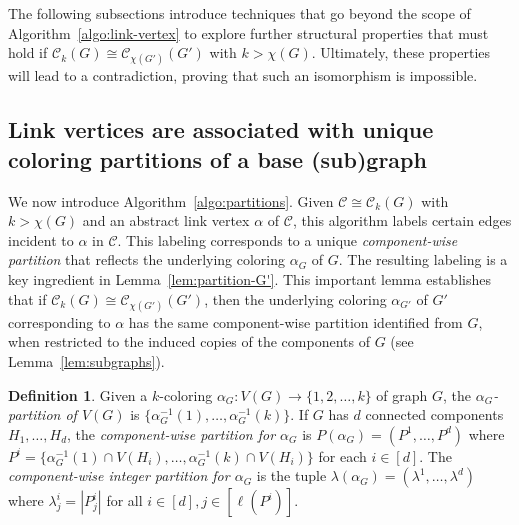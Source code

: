 \documentclass{amsart}
\theoremstyle{hypothesisstyle}
\newcommand{\set}[1]{\{#1\}}
\theoremstyle{definition}
\newtheorem{definition}[theorem]{Definition}
\theoremstyle{remark}
\numberwithin{equation}{section}
\newcommand{\C}{\mathcal C}
\begin{document}
The following subsections introduce techniques that go beyond the scope of Algorithm~\ref{algo:link-vertex} to explore further structural properties that must hold if $ \C_k(G)\cong \C_{\chi(G')}(G')$ with $k>\chi(G)$. Ultimately, these properties will lead to a contradiction, proving that such an isomorphism is impossible.

\subsection{Link vertices are associated with unique coloring partitions of a base (sub)graph}\label{subsect:partition}
We now introduce Algorithm~\ref{algo:partitions}. 
Given $\C\cong\C_k(G)$ with $k>\chi(G)$ and an abstract link vertex $\alpha$ of $\C$, this algorithm labels certain edges incident to $\alpha$ in $\C$. This labeling corresponds to a unique {\em component-wise partition} that reflects the underlying coloring $\alpha_G$ of $G$. The resulting labeling is a key ingredient in Lemma~\ref{lem:partition-G'}. This important lemma establishes that if $\C_k(G)\cong \C_{\chi(G')}(G')$, then the underlying coloring $\alpha_{G'}$ of $G'$ corresponding to $\alpha$ has the same component-wise partition identified from $G$, when restricted to the induced copies of the components of $G$ (see Lemma~\ref{lem:subgraphs}).

\begin{definition}\label{def:comp-partition}
    Given a $k$-coloring $\alpha_G\colon V(G)\to \{1, 2, \dots, k\}$ of graph $G$, the {\em $\alpha_G$-partition of $V(G)$} is $\set{\alpha_G^{-1}(1),\dots,\alpha_G^{-1}(k)}$. If $G$ has $d$ connected components $H_1,\dots,H_d$, the {\em component-wise partition for $\alpha_G$} is  $P(\alpha_G)=(P^1,\dots,P^d)$ where $P^i=\set{\alpha_G^{-1}(1)\cap V(H_i), \dots, \alpha_G^{-1}(k)\cap V(H_i)}$ for each $i\in[d]$. 
    The \emph{component-wise integer partition for $\alpha_G$} is the tuple $\lambda(\alpha_G) = (\lambda^{1}, \dots, \lambda^{d})$ where $\lambda^{i}_j = |P^i_j|$ for all $i\in[d],j\in[\ell(P^i)]$. 
\end{definition}
\end{document}
